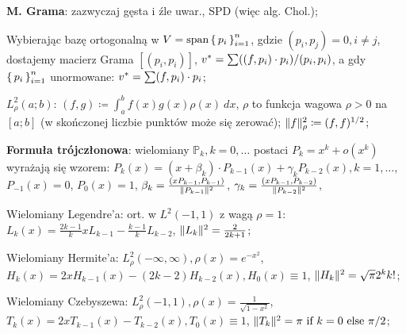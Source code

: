 \entry
\textbf{M. Grama}: zazwyczaj gęsta i źle uwar., SPD (więc alg. Chol.);

\entry
Wybierając bazę ortogonalną w $V = \text{span}\set{p_i}^n_{i=1}$,
gdzie $(p_i, p_j) = 0, i \neq j$, dostajemy macierz Grama
$[(p_i, p_i)]$,
$v^{*} = \sum((f,p_i)\cdot p_i)/(p_i, p_i)$,
a gdy $\set{p_i}^n_{i=1}$ unormowane:
$v^{*} = \sum(f,p_i)\cdot p_i$;

\entry
$L^2_\rho(a;b)$:
$(f,g) \coloneqq \int^b_a f(x)g(x)\rho(x) \ dx$,
$\rho$ to funkcja wagowa $\rho > 0$ na $[a;b]$
(w skończonej liczbie punktów może się zerować);
$\|f\|^2_\rho \coloneqq (f,f)^{1/2}$;

\entry
\textbf{Formuła trójczłonowa}:
wielomiany $\mathbb{P}_k, k=0,\ldots$ postaci
$P_k = x^k + o(x^k)$ wyrażają się wzorem:
$P_k(x) = (x + \beta_k) \cdot P_{k-1}(x) + \gamma_k P_{k-2}(x), k=1,\ldots$,
$P_{-1}(x)=0$,
$P_{0}(x)=1$,
$\beta_k= \frac{(x P_{k-1}, P_{k-1})}{\|P_{k-1}\|^2}$,
$\gamma_k = \frac{(x P_{k-1}, P_{k-2})}{\|P_{k-2}\|^2}$,

\entry
Wielomiany Legendre'a:
ort. w $L^2(-1,1)$ z wagą $\rho = 1$:
$L_k(x) = \frac{2k-1}{k}xL_{k-1} - \frac{k-1}{k}L_{k-2}$,
$\|L_k\|^2=\frac{2}{2k+1}$;

\entry
Wielomiany Hermite'a:
$L^2_\rho(-\infty, \infty), \rho(x)=e^{-x^2}$,
$H_k(x) = 2xH_{k-1}(x) - (2k-2) H_{k-2}(x), H_0(x) \equiv 1$,
$\|H_k\|^2 = \sqrt{\pi}2^kk!$;

\entry
Wielomiany Czebyszewa:
$L_\rho^2(-1,1), \rho(x)=\frac{1}{\sqrt{1-x^2}}$,
$T_k(x) = 2xT_{k-1}(x) - T_{k-2}(x), T_0(x)\equiv 1$,
$\|T_k\|^2 = \pi \text{ if } k=0 \text{ else } \pi/2$;
